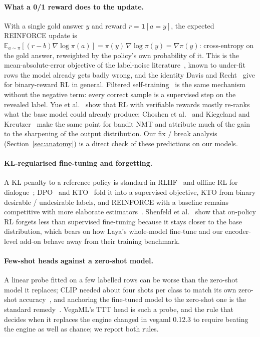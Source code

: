 \documentclass[11pt]{article}
\begin{document}
\paragraph{What a 0/1 reward does to the update.}
With a single gold answer $y$ and reward $r = \mathbf 1[a = y]$, the expected REINFORCE update is $\mathbb E_{a\sim\pi}[(r - b)\nabla\log\pi(a)] = \pi(y)\,\nabla\log\pi(y) = \nabla \pi(y)$: cross-entropy on the gold answer, reweighted by the policy's own probability of it. This is the mean-absolute-error objective of the label-noise literature~\citep{ghosh2017robust,zhang2018generalized}, known to under-fit rows the model already gets badly wrong, and the identity Davis and Recht~\citep{davis2025reinforce} give for binary-reward RL in general. Filtered self-training~\citep{zelikman2022star,dong2023raft,xiong2025minimalist} is the same mechanism without the negative term: every correct sample is a supervised step on the revealed label. Yue et al.~\citep{yue2025does} show that RL with verifiable rewards mostly re-ranks what the base model could already produce; Choshen et al.~\citep{choshen2020weaknesses} and Kiegeland and Kreutzer~\citep{kiegeland2021revisiting} make the same point for bandit NMT and attribute much of the gain to the sharpening of the output distribution. Our fix / break analysis (Section~\ref{sec:anatomy}) is a direct check of these predictions on our models.

\paragraph{KL-regularised fine-tuning and forgetting.}
A KL penalty to a reference policy is standard in RLHF~\citep{ziegler2019finetuning,stiennon2020summarize,ouyang2022instructgpt,christiano2017deep} and offline RL for dialogue~\citep{jaques2019way}; DPO~\citep{rafailov2023dpo} and KTO~\citep{ethayarajh2024kto} fold it into a supervised objective, KTO from binary desirable / undesirable labels, and REINFORCE with a baseline remains competitive with more elaborate estimators~\citep{ahmadian2024rloo}. Shenfeld et al.~\citep{shenfeld2026razor} show that on-policy RL forgets less than supervised fine-tuning because it stays closer to the base distribution, which bears on how Laya's whole-model fine-tune and our encoder-level add-on behave away from their training benchmark.

\paragraph{Few-shot heads against a zero-shot model.}
A linear probe fitted on a few labelled rows can be worse than the zero-shot model it replaces; CLIP needed about four shots per class to match its own zero-shot accuracy~\citep{radford2021clip}, and anchoring the fine-tuned model to the zero-shot one is the standard remedy~\citep{wortsman2022wiseft,kumar2022lpft}. VegaML's TTT head is such a probe, and the rule that decides when it replaces the engine changed in vegaml 0.12.3 to require beating the engine as well as chance; we report both rules.
\end{document}
